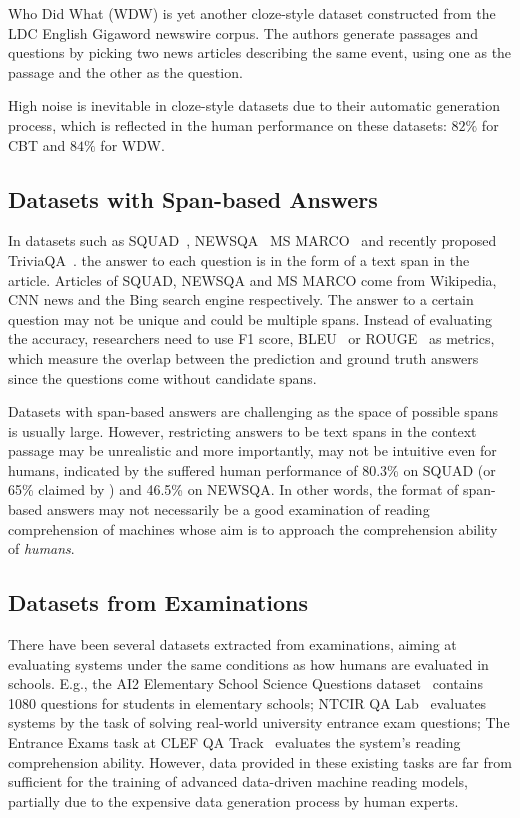 Who Did What (WDW) \cite{onishi2016did} is yet another cloze-style dataset constructed from the LDC English Gigaword newswire corpus. The authors generate passages and questions by picking two news articles describing the same event, using one as the passage and the other as the question. 

High noise is inevitable in cloze-style datasets due to their automatic generation process, which is reflected in the human performance on these datasets: $82\%$ for CBT and $84\%$ for WDW. 

\subsection{Datasets with Span-based Answers} In datasets such as SQUAD~\citep{rajpurkar2016squad}, NEWSQA~\citep{trischler2016newsqa} MS MARCO~\citep{nguyen2016ms} and recently proposed TriviaQA~\citep{joshi2017triviaqa}. the answer to each question is in the form of a text span in the article. Articles of SQUAD, NEWSQA and MS MARCO come from Wikipedia, CNN news and the Bing search engine respectively. The answer to a certain question may not be unique and could be multiple spans. Instead of evaluating the accuracy, researchers need to use F1 score, BLEU~\citep{papineni2002bleu} or ROUGE~\citep{lin2003automatic} as metrics, which measure the overlap between the prediction and ground truth answers since the questions come without candidate spans.

Datasets with span-based answers are challenging as the space of possible spans is usually large. However, restricting answers to be text spans in the context passage may be unrealistic and more importantly, may not be intuitive even for humans, indicated by the suffered human performance of 80.3\% on SQUAD (or 65\% claimed by \citet{trischler2016newsqa}) and 46.5\% on NEWSQA. In other words, the format of span-based answers may not necessarily be a good examination of reading comprehension of machines whose aim is to approach the comprehension ability of \emph{humans}. 

\subsection{Datasets from Examinations} There have been several datasets extracted from examinations, aiming at evaluating systems under the same conditions as how humans are evaluated in schools. E.g., the AI2 Elementary School Science Questions dataset~\citep{khashabi2016question} contains 1080 questions for students in elementary schools; NTCIR QA Lab~\citep{shibuki2014overview} evaluates systems by the task of solving real-world university entrance exam questions; The Entrance Exams task at CLEF QA Track~\citep{penas2014overview, rodrigo2015overview} evaluates the system's reading comprehension ability. However, data provided in these existing tasks are far from sufficient for the training of advanced data-driven machine reading models, partially due to the expensive data generation process by human experts.

